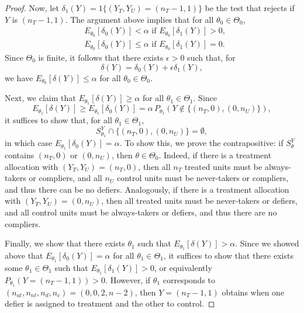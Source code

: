 \documentclass[12pt,reqno]{amsart}
\begin{document}
\begin{proof}
Now, let $\delta_1(Y) = 1\{ (Y_T,Y_U) = (n_T-1,1)\}$ be the test that rejects if $Y$ is $(n_T-1,1)$. The argument above implies that for all $\theta_0 \in \Theta_0$,
\begin{align*}
& E_{\theta_0 }[\delta_0(Y)]  < \alpha \text{ if } E_{\theta_0}[\delta_1(Y)] > 0, \\
& E_{\theta_0 }[\delta_0(Y)] \leq  \alpha \text{ if } E_{\theta_0}[\delta_1(Y)] = 0 .
\end{align*}
Since $\Theta_0$ is finite, it follows that there exists $\epsilon >0$ such that, for
\[
\delta(Y) = \delta_0(Y) + \epsilon \delta_1(Y),
\]
we have $E_{\theta_0}[ \delta(Y) ] \leq \alpha$ for all $\theta_0 \in \Theta_0$. 

Next, we claim that $E_{\theta_1}[\delta(Y)] \geq \alpha$ for all $\theta_1 \in \Theta_1$. Since
\[
E_{\theta_1}[\delta(Y)] \geq E_{\theta_1}[ \delta_0(Y) ] 
= \alpha \, P_{\theta_1}\!\left( Y \not\in \{(n_T,0), (0,n_U) \} \right),
\]
it suffices to show that, for all $\theta_1 \in \Theta_1$,
\[
S_{\theta_1}^Y \cap \{(n_T,0), (0,n_U) \} = \emptyset,
\]
in which case $E_{\theta_1}[\delta_0(Y)] = \alpha$. To show this, we prove the contrapositive: if $S_{\theta}^Y$ contains $(n_T,0)$ or $(0,n_U)$, then $\theta \in \Theta_0$. Indeed, if there is a treatment allocation with $(Y_T,Y_U) = (n_T,0)$, then all $n_T$ treated units must be always-takers or compliers, and all $n_U$ control units must be never-takers or compliers, and thus there can be no defiers. Analogously, if there is a treatment allocation with $(Y_T,Y_U) = (0,n_U)$, then all treated units must be never-takers or defiers, and all control units must be always-takers or defiers, and thus there are no compliers.

Finally, we show that there exists $\theta_1$ such that $E_{\theta_1}[\delta(Y)] > \alpha$. Since we showed above that $E_{\theta_1}[\delta_0(Y)] = \alpha$ for all $\theta_1 \in \Theta_1$, it suffices to show that there exists some $\theta_1 \in \Theta_1$ such that $E_{\theta_1}[\delta_1(Y)] > 0$, or equivalently $P_{\theta_1}( Y = (n_T-1,1) ) > 0$. However, if $\theta_1$ corresponds to $(n_{at},n_{nt},n_d,n_c) = (0,0,2,n-2)$, then $Y = (n_T-1,1)$ obtains when one defier is assigned to treatment and the other to control.
\end{proof}
\end{document}

